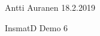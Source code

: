 \documentclass[a4paper,12pt]{article}
\begin{document}
\noindent Antti Auranen
\hfill 18.2.2019
\vspace{20mm}
\begin{center}
\huge{InsmatD Demo 6}
\end{center}



\end{document}
